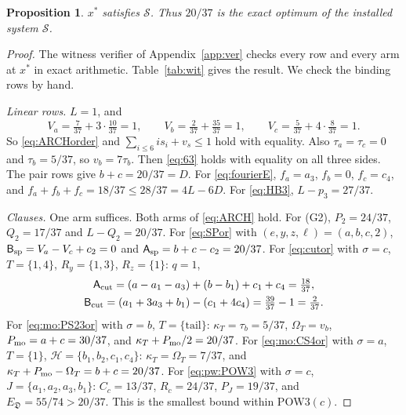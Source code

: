 \documentclass{amsart}
\newtheorem{proposition}[lemma]{Proposition}
\theoremstyle{definition}
\theoremstyle{plain}
\numberwithin{equation}{section}
\numberwithin{table}{section}
\begin{document}
\begin{proposition}\label{prop:wit}
$x^*$ satisfies $\mathcal S$. Thus $20/37$ is the exact optimum of the
installed system $\mathcal S$.
\end{proposition}

\begin{proof}
The witness verifier of Appendix~\ref{app:ver} checks every row and every arm
at $x^*$ in exact arithmetic. Table~\ref{tab:wit} gives the result. We check
the binding rows by hand.

\emph{Linear rows.} $L=1$, and
\[
 V_a=\tfrac7{37}+3\cdot\tfrac{10}{37}=1,\qquad
 V_b=\tfrac2{37}+\tfrac{35}{37}=1,\qquad
 V_c=\tfrac5{37}+4\cdot\tfrac8{37}=1 .
\]
So \eqref{eq:ARCHorder} and $\sum_{i\le6}is_i+v_s\le1$ hold with equality.
Also $\tau_a=\tau_c=0$ and $\tau_b=5/37$, so $v_b=7\tau_b$. Then
\eqref{eq:63} holds with equality on all three sides. The pair rows give
$b+c=20/37=D$. For \eqref{eq:fourierE}, $f_a=a_3$, $f_b=0$, $f_c=c_4$, and
$f_a+f_b+f_c=18/37\le28/37=4L-6D$. For \eqref{eq:HB3},
$L-p_3=27/37$.

\emph{Clauses.} One arm suffices. Both arms of \eqref{eq:ARCH} hold. For
(G2), $P_2=24/37$, $Q_2=17/37$ and $L-Q_2=20/37$. For \eqref{eq:SPor} with
$(e,y,z,\ell)=(a,b,c,2)$, $\mathsf B_{\rm sp}=V_a-V_c+c_2=0$ and
$\mathsf A_{\rm sp}=b+c-c_2=20/37$. For \eqref{eq:cutor} with $\sigma=c$,
$T=\{1,4\}$, $R_y=\{1,3\}$, $R_z=\{1\}$: $q=1$,
\[
 \begin{gathered}
 \mathsf A_{\rm cut}=(a-a_1-a_3)+(b-b_1)+c_1+c_4=\tfrac{18}{37},\\
 \mathsf B_{\rm cut}=(a_1+3a_3+b_1)-(c_1+4c_4)=\tfrac{39}{37}-1=\tfrac2{37}.
 \end{gathered}
\]
For \eqref{eq:mo:PS23or} with $\sigma=b$, $T=\{\mathrm{tail}\}$:
$\kappa_T=\tau_b=5/37$, $\Omega_T=v_b$, $P_{\rm mo}=a+c=30/37$, and
$\kappa_T+P_{\rm mo}/2=20/37$. For
\eqref{eq:mo:CS4or} with $\sigma=a$, $T=\{1\}$,
$\mathcal H=\{b_1,b_2,c_1,c_4\}$: $\kappa_T=\Omega_T=7/37$, and
$\kappa_T+P_{\rm mo}-\Omega_T=b+c=20/37$. For \eqref{eq:pw:POW3} with $\sigma=c$,
$J=\{a_1,a_2,a_3,b_1\}$: $C_c=13/37$, $R_c=24/37$, $P_J=19/37$, and
$E_{\mathfrak D}=55/74>20/37$. This is the smallest bound within
$\mathrm{POW3}(c)$.
\end{proof}
\end{document}
